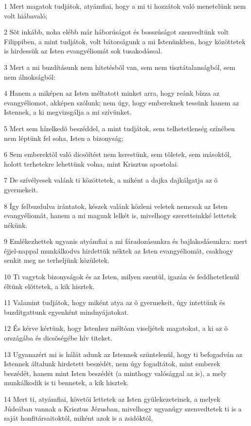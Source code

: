 \par 1 Mert magatok tudjátok, atyámfiai, hogy a mi ti hozzátok való menetelünk nem volt hiábavaló;
\par 2 Sõt inkább, noha elébb már háborúságot és bosszúságot szenvedtünk volt Filippiben, a mint tudjátok, volt bátorságunk a mi Istenünkben, hogy közöttetek is hirdessük az Isten evangyéliomát sok tusakodással.
\par 3 Mert a mi buzdításunk nem hitetésbõl van, sem nem tisztátalanságból, sem nem álnokságból:
\par 4 Hanem a miképen az Isten méltatott minket arra, hogy reánk bízza az evangyéliomot, akképen szólunk; nem úgy, hogy embereknek tessünk hanem az Istennek, a ki megvizsgálja a mi szívünket.
\par 5 Mert sem hízelkedõ beszéddel, a mint tudjátok, sem telhetetlenség színében nem léptünk fel soha, Isten a bizonyság;
\par 6 Sem emberektõl való dicsõítést nem kerestünk, sem tõletek, sem másoktól, holott terhetekre lehettünk volna, mint Krisztus apostolai.
\par 7 De szívélyesek valánk ti közöttetek, a miként a dajka dajkálgatja az õ gyermekeit.
\par 8 Így felbuzdulva irántatok, készek valánk közleni veletek nemcsak az Isten evangyéliomát, hanem a mi magunk lelkét is, mivelhogy szeretteinkké lettetek nékünk.
\par 9 Emlékezhettek ugyanis atyámfiai a mi fáradozásunkra és bajlakodásunkra: mert éjjel-nappal munkálkodva hirdettük néktek az Isten evangyéliomát, csakhogy senkit meg ne terheljünk közületek.
\par 10 Ti vagytok bizonyságok és az Isten, milyen szentül, igazán és feddhetetlenül éltünk elõttetek, a kik hisztek.
\par 11 Valamint tudjátok, hogy miként atya az õ gyermekeit, úgy intettünk és buzdítgattunk egyenként mindnyájatokat.
\par 12 És kérve kértünk, hogy Istenhez méltóan viseljétek magatokat, a ki az õ országába és dicsõségébe hív titeket.
\par 13 Ugyanazért mi is hálát adunk az Istennek szüntelenül, hogy ti befogadván az Istennek általunk hirdetett beszédét, nem úgy fogadtátok, mint emberek beszédét, hanem mint Isten beszédét (a minthogy valósággal az is), a mely munkálkodik is ti bennetek, a kik hisztek.
\par 14 Mert ti, atyámfiai, követõi lettetek az Isten gyülekezeteinek, a melyek Júdeában vannak a Krisztus Jézusban, mivelhogy ugyanúgy szenvedtetek ti is a saját honfitársaitoktól, miként azok is a zsidóktól,
